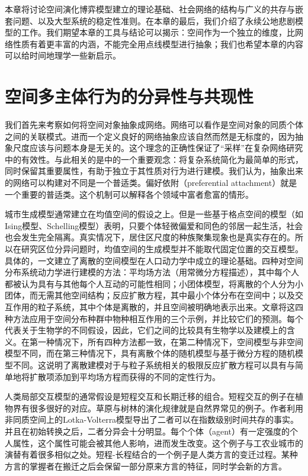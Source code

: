 本章将讨论空间演化博弈模型建立的理论基础、社会网络的结构与广义的共存与嵌套问题、以及大型系统的稳定性准则。在本章的最后，我们介绍了永续公地悲剧模型的工作。我们期望本章的工具与结论可以揭示：空间作为一个独立的维度，比网络性质有着更丰富的内涵，不能完全用点线模型进行抽象；我们也希望本章的内容可以给时间地理学一些新启示。

\section{空间多主体行为的分异性与共现性}

我们首先来考察如何将空间对象抽象成网络。网络可以看作是空间对象的同质个体之间的关联模式。进而一个定义良好的网络抽象应该自然而然是无标度的，因为抽象尺度应该与问题本身是无关的。这个理念的正确性保证了“采样”在复杂网络研究中的有效性。与此相关的是\cite{PhysRevLett.107.158702}中的一个重要观念：将复杂系统简化为最简单的形式，同时保留其重要属性，有助于独立于其性质对行为进行建模。我们认为，抽象出来的网络可以构建对不同是一个普适类。偏好依附（preferential attachment）就是一个重要的普适类。这个机制可以解释各个领域中富者愈富的情形。

城市生成模型通常建立在均值空间的假设之上。但是一些基于格点空间的模型（如Ising模型、Schelling模型\cite{stauffer2007ising}）表明，只要个体轻微偏爱和同色的邻居一起生活，社会也会发生完全隔离。真实情况下，居住区尺度的种族聚集现象也是真实存在的。所以在研究区位分异问题时，均值空间的生成模型并不能取代固定位置的交互模型。具体的，\cite{DURRETT1994363}一文建立了离散的空间模型在人口动力学中成立的理论基础。四种对空间分布系统动力学进行建模的方法：平均场方法（用常微分方程描述），其中每个人都被认为具有与其他每个人互动的可能性相同；小团体模型，将离散的个人分为小团体，而无需其他空间结构；反应扩散方程，其中最小个体分布在空间中；以及交互作用的粒子系统，其中个体是离散的，并且空间被明确地表示出来。文章将这四种方法应用于空间分布种群中物种相互作用的三个示例，并比较它们的预测。每个代表关于生物学的不同假设，因此，它们之间的比较具有生物学以及建模上的含义。在第一种情况下，所有四种方法都一致，在第二种情况下，空间模型与非空间模型不同，而在第三种情况下，具有离散个体的随机模型与基于微分方程的随机模型不同。这说明了离散建模对于与粒子系统相关的极限反应扩散方程可以具有与简单地将扩散项添加到平均场方程而获得的不同的定性行为。

人类局部交互模型的通常假设是短程交互和长期迁移的组合。短程交互的例子在植物界有很多很好的对应。草原与树林的演化规律就是自然界常见的例子\cite{durrett2018heterogeneous}。作者利用非同质空间上的Lotka-Volterra模型导出了二者可以在指数级别时间共存的事实。并且在初始转换之后，二者分异会十分明显。每个个体（agent）有一定强度的个人属性，这个属性可能会被其他人影响，进而发生改变。这个例子与工农业城市的演替有着很多相似之处。短程-长程结合的一个例子是人类方言的变迁过程\cite{PhysRevX.7.031008,seoane2018coexistence}。某种方言的掌握者在搬迁之后会保留一部分原来方言的特征，同时学会新的方言。

